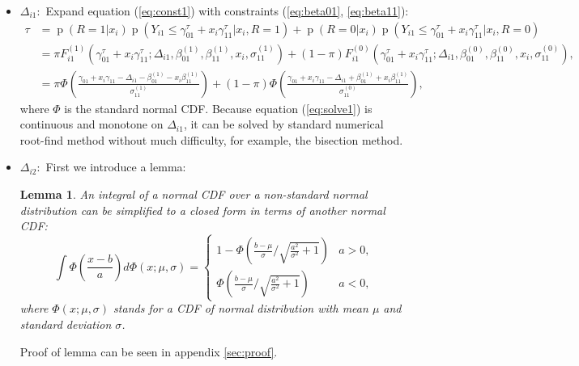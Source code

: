 \documentclass[12pt]{article}
\newtheorem{lem}[thm]{Lemma}
\DeclareMathOperator{\pr}{p}
\begin{document}
\begin{itemize}
\item \textbf{$\Delta_{i1}: $} Expand equation (\ref{eq:const1}) with
  constraints (\ref{eq:beta01}, \ref{eq:beta11}):
  \begin{align}
    \tau & = \pr (R = 1 | x_i) \pr (Y_{i1} \leq \gamma^{\tau}_{01} + x_i \gamma^{\tau}_{11} | x_i , R = 1) + \pr(R = 0 | x_i) \pr (Y_{i1} \leq \gamma^{\tau}_{01} + x_i \gamma^{\tau}_{11} | x_i , R = 0) \nonumber \\
    & = \pi F_{i1}^{(1)} (\gamma^{\tau}_{01} + x_i \gamma^{\tau}_{11};
    \Delta_{i1}, \beta_{01}^{(1)}, \beta_{11}^{(1)}, x_i,
    \sigma_{11}^{(1)}) + (1-\pi)F_{i1}^{(0)} (\gamma^{\tau}_{01} + x_i
    \gamma^{\tau}_{11};
    \Delta_{i1}, \beta_{01}^{(0)}, \beta_{11}^{(0)}, x_i, \sigma_{11}^{(0)}) , \nonumber \\
    \label{eq:solve1}
    & = \pi \Phi \left( \frac{\gamma_{01}+ x_i\gamma_{11} -
        \Delta_{i1} - \beta_{01}^{(1)} -
        x_i\beta_{11}^{(1)}}{\sigma_{11}^{(1)}} \right) + (1-\pi) \Phi
    \left( \frac{\gamma_{01} + x_i\gamma_{11} - \Delta_{i1} +
        \beta_{01}^{(1)} + x_i\beta_{11}^{(1)}}{\sigma_{11}^{(0)}}
    \right),
  \end{align}
  where $\Phi$ is the standard normal CDF. Because equation
  (\ref{eq:solve1}) is continuous and monotone on $\Delta_{i1}$, it
  can be solved by standard numerical root-find method without much
  difficulty, for example, the bisection method.

\item \textbf{$\Delta_{i2}: $} First we introduce a lemma:
  \begin{lem}
    An integral of a normal CDF over a non-standard normal
    distribution can be simplified to a closed form in terms of
    another normal CDF:
    \begin{equation}
      \label{eq:lem}
      \int \Phi \left( \frac{x-b}{a} \right) d\Phi(x; \mu, \sigma)  = 
      \begin{cases}
        1- \Phi \left( \frac{b-\mu}{\sigma} \big / \sqrt{\frac{a^2}{\sigma^2}+1} \right) & a > 0, \\
        \Phi \left( \frac{b-\mu}{\sigma} \big /
          \sqrt{\frac{a^2}{\sigma^2}+1} \right) & a < 0 ,
      \end{cases}
    \end{equation}
    where $\Phi(x; \mu, \sigma)$ stands for a CDF of normal
    distribution with mean $\mu$ and standard deviation $\sigma$.
  \end{lem}
  Proof of lemma can be seen in appendix \ref{sec:proof}.


\end{itemize}
\end{document}
